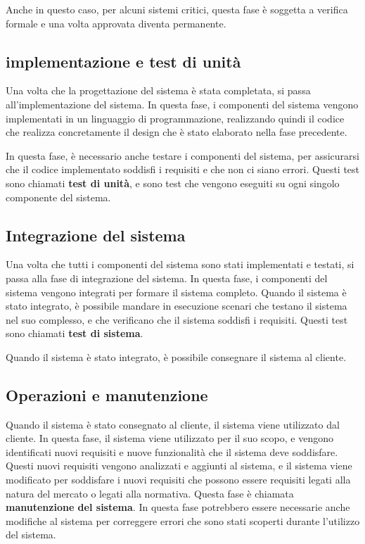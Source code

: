 Anche in questo caso, per alcuni sistemi critici, questa fase è soggetta a verifica formale e 
una volta approvata diventa permanente.
\subsection{implementazione e test di unità}
Una volta che la progettazione del sistema è stata completata, si passa all'implementazione
del sistema. In questa fase, i componenti del sistema vengono implementati in un linguaggio
di programmazione, realizzando quindi il codice che realizza concretamente il design 
che è stato elaborato nella fase precedente.

In questa fase, è necessario anche testare i componenti del sistema, per assicurarsi che
il codice implementato soddisfi i requisiti e che non ci siano errori. Questi test
sono chiamati \textbf{test di unità}, e sono test che vengono eseguiti su ogni singolo
componente del sistema. 
\subsection{Integrazione del sistema}
Una volta che tutti i componenti del sistema sono stati implementati e testati, si passa
alla fase di integrazione del sistema. In questa fase, i componenti del sistema vengono
integrati per formare il sistema completo. Quando il sistema è stato integrato, è 
possibile mandare in esecuzione scenari che testano il sistema nel suo complesso, e che
verificano che il sistema soddisfi i requisiti. Questi test sono chiamati \textbf{test di
sistema}.

Quando il sistema è stato integrato, è possibile consegnare il sistema al cliente.
\subsection{Operazioni e manutenzione}
Quando il sistema è stato consegnato al cliente, il sistema viene utilizzato dal cliente.
In questa fase, il sistema viene utilizzato per il suo scopo, e vengono identificati
nuovi requisiti e nuove funzionalità che il sistema deve soddisfare. Questi nuovi requisiti
vengono analizzati e aggiunti al sistema, e il sistema viene modificato per soddisfare
i nuovi requisiti che possono essere requisiti legati alla natura del mercato o 
legati alla normativa. Questa fase è chiamata \textbf{manutenzione del sistema}.
In questa fase potrebbero essere necessarie anche modifiche al sistema per correggere
errori che sono stati scoperti durante l'utilizzo del sistema.
